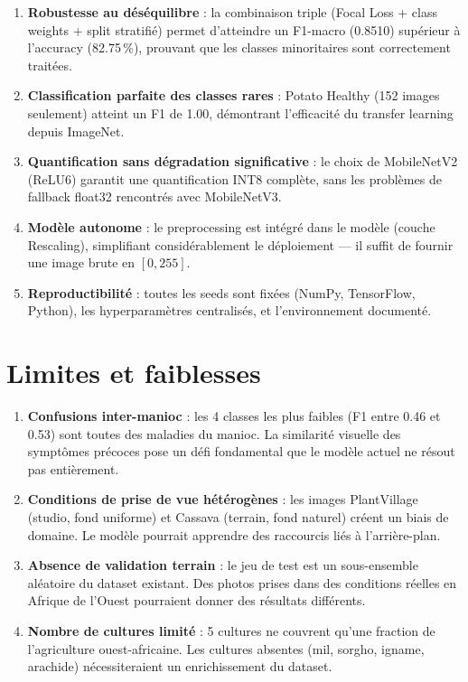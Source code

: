 \documentclass[12pt, a4paper, twoside]{report}
\begin{document}
\begin{enumerate}
    \item \textbf{Robustesse au déséquilibre} : la combinaison triple (Focal Loss + class weights + split stratifié) permet d'atteindre un F1-macro (0.8510) supérieur à l'accuracy (82.75\,\%), prouvant que les classes minoritaires sont correctement traitées.

    \item \textbf{Classification parfaite des classes rares} : Potato Healthy (152 images seulement) atteint un F1 de 1.00, démontrant l'efficacité du transfer learning depuis ImageNet.

    \item \textbf{Quantification sans dégradation significative} : le choix de MobileNetV2 (ReLU6) garantit une quantification INT8 complète, sans les problèmes de fallback float32 rencontrés avec MobileNetV3.

    \item \textbf{Modèle autonome} : le preprocessing est intégré dans le modèle (couche Rescaling), simplifiant considérablement le déploiement — il suffit de fournir une image brute en $[0, 255]$.

    \item \textbf{Reproductibilité} : toutes les seeds sont fixées (NumPy, TensorFlow, Python), les hyperparamètres centralisés, et l'environnement documenté.
\end{enumerate}

\section{Limites et faiblesses}

\begin{enumerate}
    \item \textbf{Confusions inter-manioc} : les 4 classes les plus faibles (F1 entre 0.46 et 0.53) sont toutes des maladies du manioc. La similarité visuelle des symptômes précoces pose un défi fondamental que le modèle actuel ne résout pas entièrement.

    \item \textbf{Conditions de prise de vue hétérogènes} : les images PlantVillage (studio, fond uniforme) et Cassava (terrain, fond naturel) créent un biais de domaine. Le modèle pourrait apprendre des raccourcis liés à l'arrière-plan.

    \item \textbf{Absence de validation terrain} : le jeu de test est un sous-ensemble aléatoire du dataset existant. Des photos prises dans des conditions réelles en Afrique de l'Ouest pourraient donner des résultats différents.

    \item \textbf{Nombre de cultures limité} : 5 cultures ne couvrent qu'une fraction de l'agriculture ouest-africaine. Les cultures absentes (mil, sorgho, igname, arachide) nécessiteraient un enrichissement du dataset.
\end{enumerate}
\end{document}
